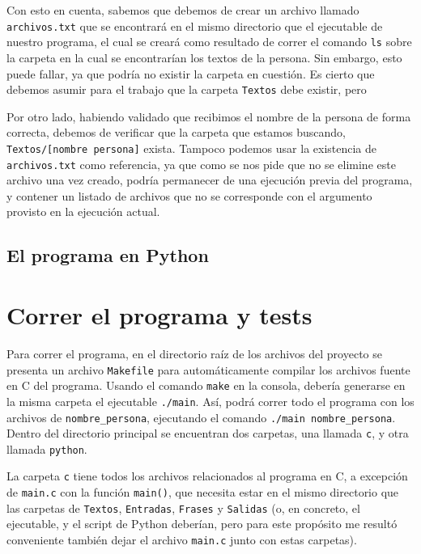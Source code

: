 \documentclass[a4paper]{article}
\begin{document}
Con esto en cuenta, sabemos que debemos de crear un archivo llamado \texttt{archivos.txt} que se encontrará en el mismo directorio que el ejecutable de nuestro programa, el cual se creará como resultado de correr el comando \texttt{ls} sobre la carpeta en la cual se encontrarían los textos de la persona. Sin embargo, esto puede fallar, ya que podría no existir la carpeta en cuestión. Es cierto que debemos asumir para el trabajo que la carpeta \texttt{Textos} debe existir, pero 

Por otro lado, habiendo validado que recibimos el nombre de la persona de forma correcta, debemos de verificar que la carpeta que estamos buscando, \texttt{Textos/[nombre persona]} exista. 
Tampoco podemos usar la existencia de \texttt{archivos.txt} como referencia, ya que como se nos pide que no se elimine este archivo una vez creado, podría permanecer de una ejecución previa del programa, y contener un listado de archivos que no se corresponde con el argumento provisto en la ejecución actual.



\subsection{El programa en Python}


\section{Correr el programa y tests}

Para correr el programa, en el directorio raíz de los archivos del proyecto se presenta un archivo \texttt{Makefile} para automáticamente compilar los archivos fuente en C del programa. Usando el comando \texttt{make} en la consola, debería generarse en la misma carpeta el ejecutable \texttt{./main}. Así, podrá correr todo el programa con los archivos de \texttt{nombre\_persona}, ejecutando el comando \texttt{./main nombre\_persona}. \\

Dentro del directorio principal se encuentran dos carpetas, una llamada \texttt{c}, y otra llamada \texttt{python}. 

La carpeta \texttt{c} tiene todos los archivos relacionados al programa en C, a excepción de \texttt{main.c} con la función \texttt{main()}, que necesita estar en el mismo directorio que las carpetas de \texttt{Textos}, \texttt{Entradas}, \texttt{Frases} y \texttt{Salidas} (o, en concreto, el ejecutable, y el script de Python deberían, pero para este propósito me resultó conveniente también dejar el archivo \texttt{main.c} junto con estas carpetas).
\end{document}
